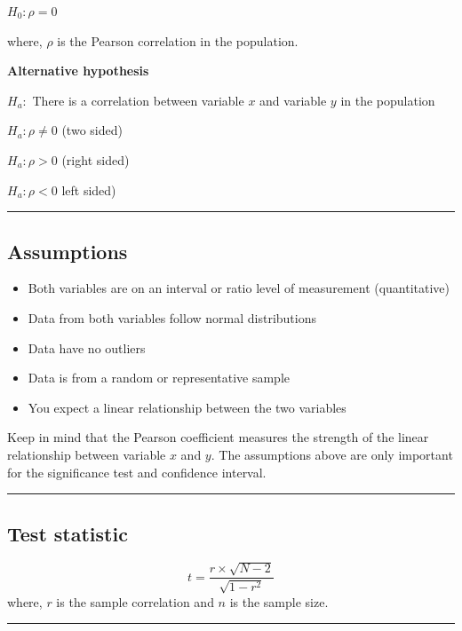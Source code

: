 \documentclass[
]{article}
\begin{document}
\(H_0:\rho = 0\)

where, \(\rho\) is the Pearson correlation in the population.

\textbf{Alternative hypothesis}

\(H_a:\) There is a correlation between variable \(x\) and variable \(y\) in the population

\(H_a: \rho \neq 0\) (two sided)

\(H_a: \rho > 0\) (right sided)

\(H_a: \rho < 0\) left sided)

\begin{center}\rule{0.5\linewidth}{0.5pt}\end{center}

\hypertarget{assumptions}{%
\subsection{Assumptions}\label{assumptions}}

\begin{itemize}
\item
  Both variables are on an interval or ratio level of measurement (quantitative)
\item
  Data from both variables follow normal distributions
\item
  Data have no outliers
\item
  Data is from a random or representative sample
\item
  You expect a linear relationship between the two variables
\end{itemize}

Keep in mind that the Pearson coefficient measures the strength of the linear relationship between variable \(x\) and \(y\). The assumptions above are only important for the significance test and confidence interval.

\begin{center}\rule{0.5\linewidth}{0.5pt}\end{center}

\hypertarget{test-statistic}{%
\subsection{Test statistic}\label{test-statistic}}

\[
t = \dfrac{r \times \sqrt{N - 2}}{\sqrt{1 - r^2}}
\] where, \(r\) is the sample correlation and \(n\) is the sample size.

\begin{center}\rule{0.5\linewidth}{0.5pt}\end{center}
\end{document}
